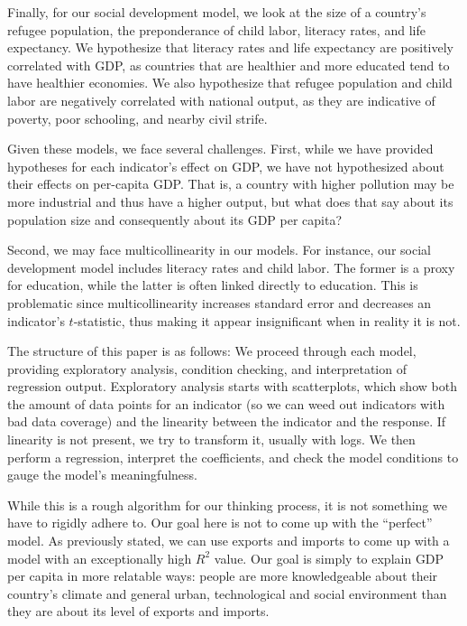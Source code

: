 \documentclass[12pt]{article}
\begin{document}
Finally, for our social development model, we look at the size of a country's refugee population, the preponderance of child labor, literacy rates, and life expectancy. We hypothesize that literacy rates and life expectancy are positively correlated with GDP, as countries that are healthier and more educated tend to have healthier economies. We also hypothesize that refugee population and child labor are negatively correlated with national output, as they are indicative of poverty, poor schooling, and nearby civil strife.

Given these models, we face several challenges. First, while we have provided hypotheses for each indicator's effect on GDP, we have not hypothesized about their effects on per-capita GDP. That is, a country with higher pollution may be more industrial and thus have a higher output, but what does that say about its population size and consequently about its GDP per capita?

Second, we may face multicollinearity in our models. For instance, our social development model includes literacy rates and child labor. The former is a proxy for education, while the latter is often linked directly to education. This is problematic since multicollinearity increases standard error and decreases an indicator's $t$-statistic, thus making it appear insignificant when in reality it is not.

The structure of this paper is as follows: We proceed through each model, providing exploratory analysis, condition checking, and interpretation of regression output. Exploratory analysis starts with scatterplots, which show both the amount of data points for an indicator (so we can weed out indicators with bad data coverage) and the linearity between the indicator and the response. If linearity is not present, we try to transform it, usually with logs. We then perform a regression, interpret the coefficients, and check the model conditions to gauge the model's meaningfulness.

While this is a rough algorithm for our thinking process, it is not something we have to rigidly adhere to. Our goal here is not to come up with the ``perfect'' model. As previously stated, we can use exports and imports to come up with a model with an exceptionally high $R^2$ value. Our goal is simply to explain GDP per capita in more relatable ways: people are more knowledgeable about their country's climate and general urban, technological and social environment than they are about its level of exports and imports.
\end{document}

